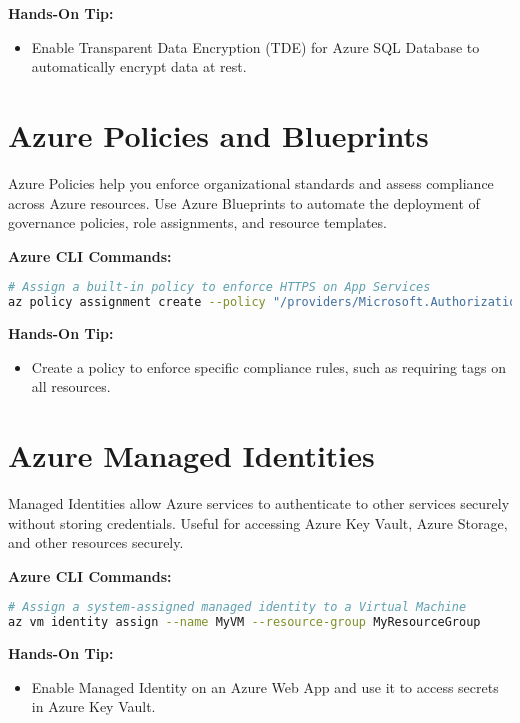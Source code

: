 \documentclass{article}
\begin{document}
\textbf{Hands-On Tip:}
\begin{itemize}
    \item Enable Transparent Data Encryption (TDE) for Azure SQL Database to automatically encrypt data at rest.
\end{itemize}

\section{Azure Policies and Blueprints}
Azure Policies help you enforce organizational standards and assess compliance across Azure resources. Use Azure Blueprints to automate the deployment of governance policies, role assignments, and resource templates.

\textbf{Azure CLI Commands:}
\begin{lstlisting}[language=bash]
# Assign a built-in policy to enforce HTTPS on App Services
az policy assignment create --policy "/providers/Microsoft.Authorization/policyDefinitions/enforce-https" --scope "/subscriptions/<subscription-id>/resourceGroups/MyResourceGroup"
\end{lstlisting}

\textbf{Hands-On Tip:}
\begin{itemize}
    \item Create a policy to enforce specific compliance rules, such as requiring tags on all resources.
\end{itemize}

\section{Azure Managed Identities}
Managed Identities allow Azure services to authenticate to other services securely without storing credentials. Useful for accessing Azure Key Vault, Azure Storage, and other resources securely.

\textbf{Azure CLI Commands:}
\begin{lstlisting}[language=bash]
# Assign a system-assigned managed identity to a Virtual Machine
az vm identity assign --name MyVM --resource-group MyResourceGroup
\end{lstlisting}

\textbf{Hands-On Tip:}
\begin{itemize}
    \item Enable Managed Identity on an Azure Web App and use it to access secrets in Azure Key Vault.
\end{itemize}
\end{document}
